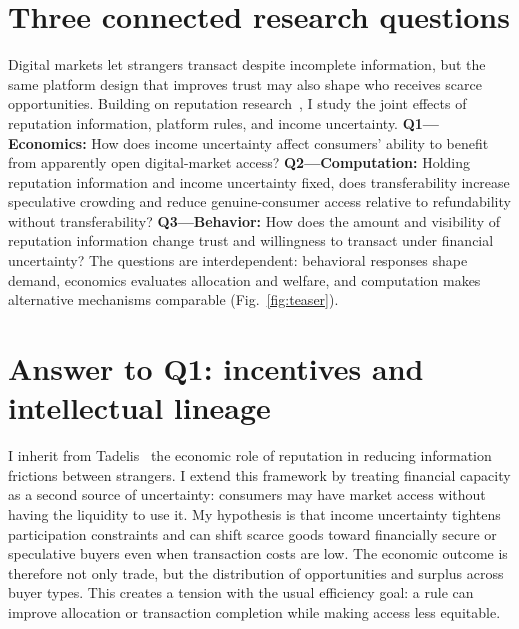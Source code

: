 \section{Three connected research questions}
Digital markets let strangers transact despite incomplete information, but the same platform design that improves trust may also shape who receives scarce opportunities. Building on reputation research~\cite{tadelis2016,zloteanu2018}, I study the joint effects of reputation information, platform rules, and income uncertainty. \textbf{Q1---Economics:} How does income uncertainty affect consumers' ability to benefit from apparently open digital-market access? \textbf{Q2---Computation:} Holding reputation information and income uncertainty fixed, does transferability increase speculative crowding and reduce genuine-consumer access relative to refundability without transferability? \textbf{Q3---Behavior:} How does the amount and visibility of reputation information change trust and willingness to transact under financial uncertainty? The questions are interdependent: behavioral responses shape demand, economics evaluates allocation and welfare, and computation makes alternative mechanisms comparable (Fig.~\ref{fig:teaser}).

\section{Answer to Q1: incentives and intellectual lineage}
I inherit from Tadelis~\cite{tadelis2016} the economic role of reputation in reducing information frictions between strangers. I extend this framework by treating financial capacity as a second source of uncertainty: consumers may have market access without having the liquidity to use it. My hypothesis is that income uncertainty tightens participation constraints and can shift scarce goods toward financially secure or speculative buyers even when transaction costs are low. The economic outcome is therefore not only trade, but the distribution of opportunities and surplus across buyer types. This creates a tension with the usual efficiency goal: a rule can improve allocation or transaction completion while making access less equitable.

